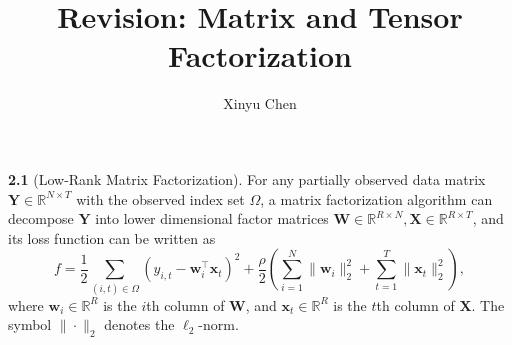 \documentclass[12pt]{article}
\title{Revision: Matrix and Tensor Factorization}
\author{Xinyu Chen}
\begin{document}
\maketitle

\noindent\textbf{2.1} (Low-Rank Matrix Factorization). For any partially observed data matrix $\boldsymbol{Y}\in\mathbb{R}^{N\times T}$ with the observed index set $\Omega$, a matrix factorization algorithm can decompose $\boldsymbol{Y}$ into lower dimensional factor matrices $\boldsymbol{W}\in\mathbb{R}^{R\times N},\boldsymbol{X}\in\mathbb{R}^{R\times T}$, and its loss function can be written as
\begin{equation}
f=\frac{1}{2}\sum_{(i,t)\in\Omega}\left(y_{i,t}-\boldsymbol{w}_{i}^{\top}\boldsymbol{x}_{t}\right)^{2}+\frac{\rho}{2}\left(\sum_{i=1}^{N}\|\boldsymbol{w}_{i}\|_{2}^{2}+\sum_{t=1}^{T}\|\boldsymbol{x}_{t}\|_{2}^{2}\right),
\end{equation}
where $\boldsymbol{w}_{i}\in\mathbb{R}^{R}$ is the $i$th column of $\boldsymbol{W}$, and $\boldsymbol{x}_{t}\in\mathbb{R}^{R}$ is the $t$th column of $\boldsymbol{X}$. The symbol $\|\cdot\|_{2}$ denotes the $\ell_2$-norm.
\end{document}
